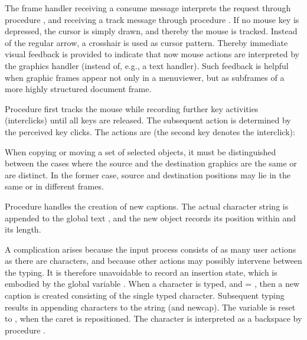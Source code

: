 \noindent The frame handler receiving a consume message interprets the request through procedure , and receiving a track message through procedure . If no mouse key is depressed, the cursor is simply drawn, and thereby the mouse is tracked. Instead of the regular arrow, a crosshair is used as cursor pattern. Thereby immediate visual feedback is provided to indicate that now mouse actions are interpreted by the graphics handler (instead of, e.g., a text handler). Such feedback is helpful when graphic frames appear not only in a menuviewer, but as subframes of a more highly structured document frame.

Procedure  first tracks the mouse while recording further key activities (interclicks) until all keys are released. The subsequent action is determined by the perceived key clicks. The actions are (the second key denotes the interclick):


When copying or moving a set of selected objects, it must be distinguished between the cases where the source and the destination graphics are the same or are distinct. In the former case, source and destination positions may lie in the same or in different frames.

Procedure  handles the creation of new captions. The actual character string is appended to the global text , and the new object records its position within  and its length.

A complication arises because the input process consists of as many user actions as there are characters, and because other actions may possibly intervene between the typing. It is therefore unavoidable to record an insertion state, which is embodied by the global variable . When a character is typed, and  = , then a new caption is created consisting of the single typed character. Subsequent typing results in appending characters to the string (and newcap). The variable is reset to , when the caret is repositioned. The  character is interpreted as a backspace by procedure .

